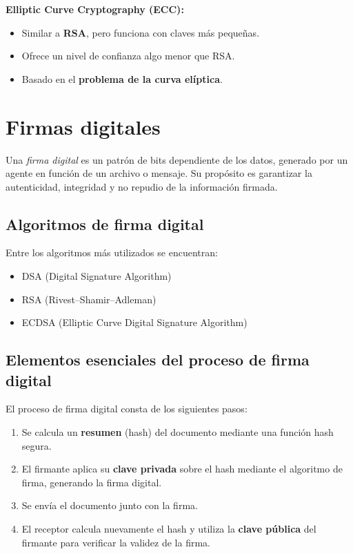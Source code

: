 \documentclass[11pt,a4paper]{article}
\begin{document}
\textbf{Elliptic Curve Cryptography (ECC):}
\begin{itemize}
    \item Similar a \textbf{RSA}, pero funciona con claves más pequeñas.
    \item Ofrece un nivel de confianza algo menor que RSA.
    \item Basado en el \textbf{problema de la curva elíptica}.
\end{itemize}



\section{Firmas digitales}

Una \emph{firma digital} es un patrón de bits dependiente de los datos, generado por un agente en función de un archivo o mensaje. Su propósito es garantizar la autenticidad, integridad y no repudio de la información firmada.

\subsection{Algoritmos de firma digital}
Entre los algoritmos más utilizados se encuentran:
\begin{itemize}
    \item DSA (Digital Signature Algorithm)
    \item RSA (Rivest–Shamir–Adleman)
    \item ECDSA (Elliptic Curve Digital Signature Algorithm)
\end{itemize}

\subsection{Elementos esenciales del proceso de firma digital}
El proceso de firma digital consta de los siguientes pasos:
\begin{enumerate}
    \item Se calcula un \textbf{resumen} (hash) del documento mediante una función hash segura.
    \item El firmante aplica su \textbf{clave privada} sobre el hash mediante el algoritmo de firma, generando la firma digital.
    \item Se envía el documento junto con la firma.
    \item El receptor calcula nuevamente el hash y utiliza la \textbf{clave pública} del firmante para verificar la validez de la firma.
\end{enumerate}
\end{document}
